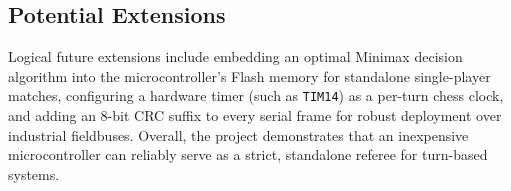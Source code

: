 \subsection{Potential Extensions}
Logical future extensions include embedding an optimal Minimax decision algorithm into the microcontroller's Flash memory for standalone single-player matches, configuring a hardware timer (such as \texttt{TIM14}) as a per-turn chess clock, and adding an 8-bit CRC suffix to every serial frame for robust deployment over industrial fieldbuses.
Overall, the project demonstrates that an inexpensive microcontroller can reliably serve as a strict, standalone referee for turn-based systems.
